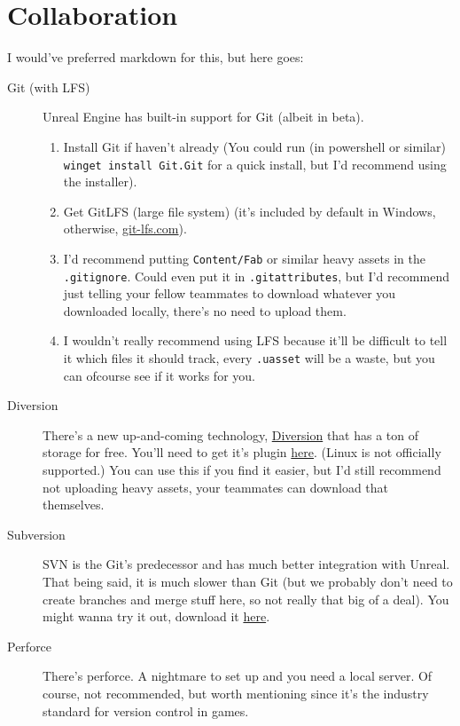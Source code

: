 \documentclass{article}
\begin{document}
	\section{Collaboration}
	I would've preferred markdown for this, but here goes:
	\begin{description}
		\item[Git (with LFS)] Unreal Engine has built-in support for Git (albeit in beta).
		\begin{enumerate}
			\item Install Git if haven't already (You could run (in powershell or similar) \verb|winget install Git.Git| for a quick install, but I'd recommend using the installer).
			\item Get GitLFS (large file system) (it's included by default in Windows, otherwise, \href{https://git-lfs.com/}{git-lfs.com}).

			\item I'd recommend putting \verb*|Content/Fab| or similar heavy assets in the \verb*|.gitignore|. Could even put it in \verb*|.gitattributes|, but I'd recommend just telling your fellow teammates to download whatever you downloaded locally, there's no need to upload them.
			\item I wouldn't really recommend using LFS because it'll be difficult to tell it which files it should track, every \verb*|.uasset| will be a waste, but you can ofcourse see if it works for you.
		\end{enumerate}
		\item[Diversion] There's a new up-and-coming technology, \href{https://www.diversion.dev/}{Diversion} that has a ton of storage for free. You'll need to get it's plugin \href{https://fab.com/s/2b880e6efd2a}{here}. (Linux is not officially supported.)
		You can use this if you find it easier, but I'd still recommend not uploading heavy assets, your teammates can download that themselves.
		\item[Subversion] SVN is the Git's predecessor and has much better integration with Unreal. That being said, it is much slower than Git (but we probably don't need to create branches and merge stuff here, so not really that big of a deal). You might wanna try it out, download it \href{https://subversion.apache.org/download.cgi}{here}.
		\item[Perforce] There's perforce. A nightmare to set up and you need a local server. Of course, not recommended, but worth mentioning since it's the industry standard for version control in games.
		   
	\end{description}
\end{document}
